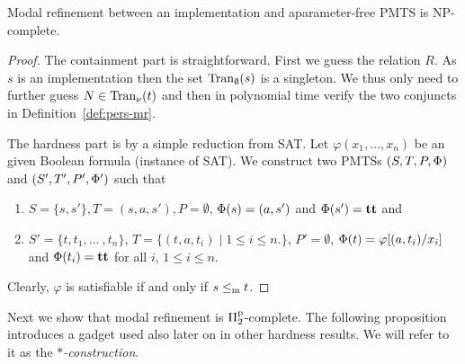 \begin{proposition} 
Modal refinement between an implementation and a\linebreak parameter-free PMTS is NP-complete.
\end{proposition}
\begin{proof}
The containment part is straightforward. 
First we guess the relation $R$.
As $s$ is an implementation then %
the set $\mathrm{Tran}_{\emptyset}(s)$ is a singleton.
We thus only need to further guess $N \in \mathrm{Tran}_{\nu}(t)$ and then in polynomial 
time verify the two conjuncts in Definition~\ref{def:pers-mr}.

The hardness part is by a simple reduction from SAT. 
Let $\varphi(x_1, \ldots, x_n)$ be an given Boolean formula (instance of SAT).
We construct two PMTSs $(S,T,P,\mathrm{\Phi})$ and \linebreak  $(S',T',P',\mathrm{\Phi}')$ such that 
\begin{enumerate}
    \item $S = \{s,s'\}, T={(s,a,s')}, P= \emptyset$, $\mathrm{\Phi}(s) = (a,s')$ and $\mathrm{\Phi}(s') = \mathbf{tt}$ and 
    \item $S'= \{t, t_1, \ldots\ , t_n\}$, $T = \{(t,a,t_i) \mid 1 \le i \le n.\}$, 
$P' = \emptyset$, $\mathrm{\Phi}(t) = \varphi[(a,t_i)/x_i]$ and $\mathrm{\Phi}(t_i) = \mathbf{tt}$ 
for all $i$, $1\le i \le n$.
\end{enumerate}
Clearly, $\varphi$ is satisfiable if and only if $s \le_\mathrm m t$.
\end{proof}


Next we show that modal refinement is $\mathrm\Pi^\mathrm p_2$-complete. 
The following proposition introduces a gadget used also later on in other 
hardness results. We will refer to it as the \emph{$*$-construction}. 

